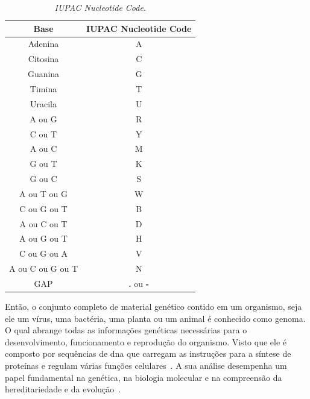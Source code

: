 \begin{table}[htb]
  \caption{\textit{IUPAC Nucleotide Code}.}
  \begin{center}
    \begin{tabular}{c|c}
      \hline
      Base             & IUPAC Nucleotide Code    \\
      \hline
      Adenina          & A                        \\
      Citosina         & C                        \\
      Guanina          & G                        \\
      Timina           & T                        \\
      Uracila          & U                        \\
      A ou G           & R                        \\
      C ou T           & Y                        \\
      A ou C           & M                        \\
      G ou T           & K                        \\
      G ou C           & S                        \\
      A ou T ou G      & W                        \\
      C ou G ou T      & B                        \\
      A ou C ou T      & D                        \\
      A ou G ou T      & H                        \\
      C ou G ou A      & V                        \\
      A ou C ou G ou T & N                        \\
      GAP              & \textbf{.} ou \textbf{-} \\
      \hline
    \end{tabular}
  \end{center}
  \label{tab:iupacNucleotideCode}
\end{table}

Então, o conjunto completo de material genético contido em um organismo, seja ele um vírus, uma bactéria, uma planta ou um animal é conhecido como genoma. O qual abrange todas as informações genéticas necessárias para o desenvolvimento, funcionamento e reprodução do organismo. Visto que ele é composto por sequências de \gls{dna} que carregam as instruções para a síntese de proteínas e regulam várias funções celulares~\cite{alberts_biologia_2017,genetics_benjamin_2016}. A sua análise desempenha um papel fundamental na genética, na biologia molecular e na compreensão da hereditariedade e da evolução~\cite{alberts_biologia_2017}.

